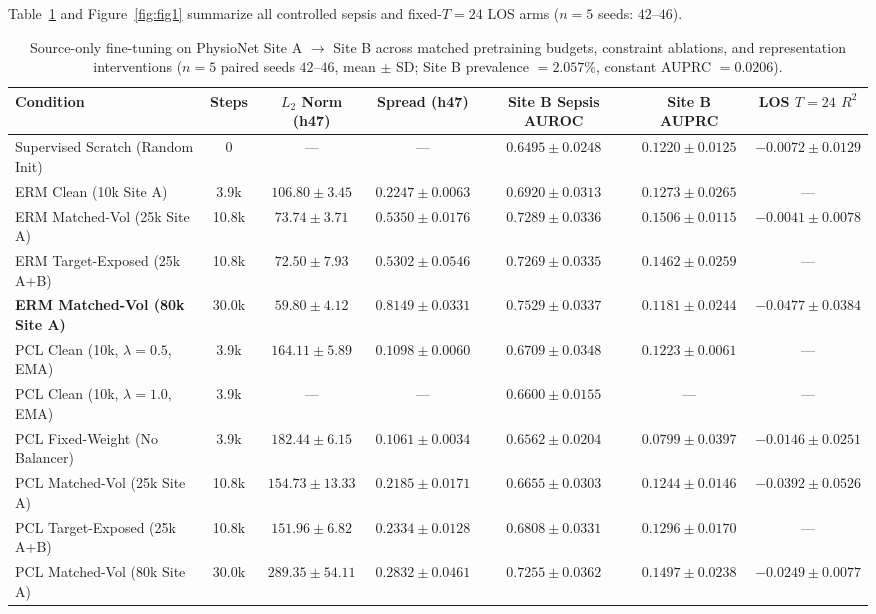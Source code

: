 \documentclass[10pt,twocolumn]{article}
\begin{document}
Table~\ref{tab:phase2c} and Figure~\ref{fig:fig1} summarize all controlled sepsis and fixed-$T=24$ LOS arms ($n=5$ seeds: $42\text{--}46$).

\begin{table}[t]
\centering
\caption{Source-only fine-tuning on PhysioNet Site A $\to$ Site B across matched pretraining budgets, constraint ablations, and representation interventions ($n=5$ paired seeds $42\text{--}46$, mean $\pm$ SD; Site B prevalence $= 2.057\%$, constant AUPRC $= 0.0206$).}
\label{tab:phase2c}
\scriptsize
\begin{tabular}{lcccccc}
\toprule
Condition & Steps & $L_2$ Norm (h47) & Spread (h47) & Site B Sepsis AUROC & Site B AUPRC & LOS $T=24$ $R^2$ \\
\midrule
Supervised Scratch (Random Init) & 0 & --- & --- & $0.6495 \pm 0.0248$ & $0.1220 \pm 0.0125$ & $-0.0072 \pm 0.0129$ \\
ERM Clean (10k Site A) & 3.9k & $106.80 \pm 3.45$ & $0.2247 \pm 0.0063$ & $0.6920 \pm 0.0313$ & $0.1273 \pm 0.0265$ & --- \\
ERM Matched-Vol (25k Site A) & 10.8k & $73.74 \pm 3.71$ & $0.5350 \pm 0.0176$ & $0.7289 \pm 0.0336$ & $\mathbf{0.1506 \pm 0.0115}$ & $-0.0041 \pm 0.0078$ \\
ERM Target-Exposed (25k A+B) & 10.8k & $72.50 \pm 7.93$ & $0.5302 \pm 0.0546$ & $0.7269 \pm 0.0335$ & $0.1462 \pm 0.0259$ & --- \\
\textbf{ERM Matched-Vol (80k Site A)} & 30.0k & $\mathbf{59.80 \pm 4.12}$ & $\mathbf{0.8149 \pm 0.0331}$ & $\mathbf{0.7529 \pm 0.0337}$ & $0.1181 \pm 0.0244$ & $-0.0477 \pm 0.0384$ \\
\midrule
PCL Clean (10k, $\lambda=0.5$, EMA) & 3.9k & $164.11 \pm 5.89$ & $0.1098 \pm 0.0060$ & $0.6709 \pm 0.0348$ & $0.1223 \pm 0.0061$ & --- \\
PCL Clean (10k, $\lambda=1.0$, EMA) & 3.9k & --- & --- & $0.6600 \pm 0.0155$ & --- & --- \\
PCL Fixed-Weight (No Balancer) & 3.9k & $182.44 \pm 6.15$ & $0.1061 \pm 0.0034$ & $0.6562 \pm 0.0204$ & $0.0799 \pm 0.0397$ & $-0.0146 \pm 0.0251$ \\
PCL Matched-Vol (25k Site A) & 10.8k & $154.73 \pm 13.33$ & $0.2185 \pm 0.0171$ & $0.6655 \pm 0.0303$ & $0.1244 \pm 0.0146$ & $-0.0392 \pm 0.0526$ \\
PCL Target-Exposed (25k A+B) & 10.8k & $151.96 \pm 6.82$ & $0.2334 \pm 0.0128$ & $0.6808 \pm 0.0331$ & $0.1296 \pm 0.0170$ & --- \\
PCL Matched-Vol (80k Site A) & 30.0k & $289.35 \pm 54.11$ & $0.2832 \pm 0.0461$ & $0.7255 \pm 0.0362$ & $0.1497 \pm 0.0238$ & $-0.0249 \pm 0.0077$ \\

\end{tabular}
\end{table}
\end{document}
